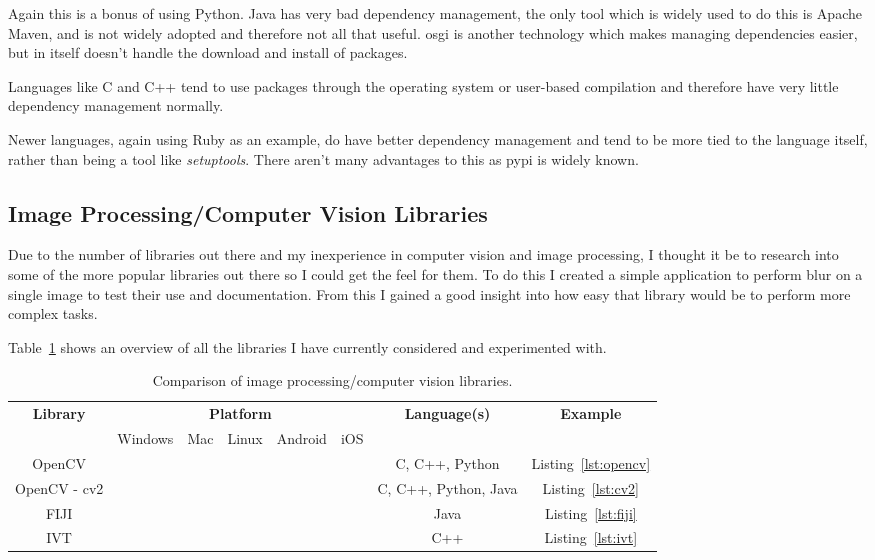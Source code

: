 Again this is a bonus of using Python. Java has very bad dependency management, the only tool
which is widely used to do this is Apache Maven, and is not widely adopted and therefore not all
that useful. \Gls{osgi} is another technology which makes managing dependencies easier, but in 
itself doesn't handle the download and install of packages.

Languages like C and C++ tend to use packages through the operating system or user-based 
compilation and therefore have very little dependency management normally.

Newer languages, again using Ruby as an example, do have better dependency management and tend to
be more tied to the language itself, rather than being a tool like \emph{setuptools}. There aren't
many advantages to this as \gls{pypi} is widely known.


\subsection{Image Processing/Computer Vision Libraries}
Due to the number of libraries out there and my inexperience in computer vision and image 
processing, I thought it be to research into some of the more popular libraries out there so I
could get the feel for them. To do this I created a simple application to  perform blur on a 
single image to test their use and documentation. From this I gained a good insight into how easy 
that library would be to perform more complex tasks.

Table~\ref{tab:libraries-overview} shows an overview of all the libraries I have currently 
considered and experimented with.

\begin{table}[h]
\begin{tabular}{| c | c | c | c | c | c | c | c |}
								  \hline
\multirow{2}{*}{\textbf{Library}}	& \multicolumn{5}{|c|}{\textbf{Platform}}			& \multirow{2}{*}{\textbf{Language(s)}}	& \textbf{Example}	\\\cline{2-6}
					&  Windows	& Mac 		& Linux 	& Android	& iOS	&			&			\\\hline
OpenCV					& \checkmark	& \checkmark	& \checkmark	& 		& 	& C, C++, Python	& Listing~\ref{lst:opencv}\\\hline
OpenCV - cv2				& \checkmark	& \checkmark	& \checkmark	& \checkmark	& \checkmark & C, C++, Python, Java	& Listing~\ref{lst:cv2}\\\hline
FIJI					& \checkmark	& \checkmark	& \checkmark	& 		&	& Java			& Listing~\ref{lst:fiji}	\\\hline
IVT					& \checkmark	& \checkmark	& \checkmark	& 		&	& C++			& Listing~\ref{lst:ivt}	\\\hline
\end{tabular}
\caption{Comparison of image processing/computer vision libraries.}
\label{tab:libraries-overview}
\end{table}

